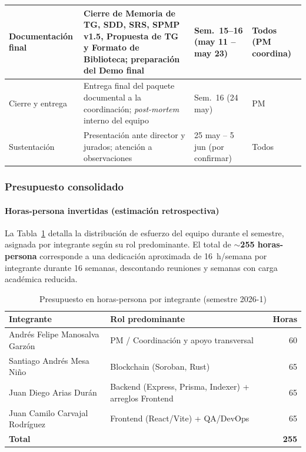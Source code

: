 \documentclass[12pt,oneside]{report}
\begin{document}
\begin{longtable}{@{}p{3.0cm} p{5.2cm} p{2.8cm} p{3.2cm}@{}}
        \midrule
        Documentación final & Cierre de Memoria de TG, SDD, SRS, SPMP v1.5, Propuesta de TG y Formato de Biblioteca; preparación del Demo final & Sem.~15--16 (may 11 -- may 23) & Todos (PM coordina)\\
        \midrule
        Cierre y entrega & Entrega final del paquete documental a la coordinación; \textit{post-mortem} interno del equipo & Sem.~16 (24 may) & PM\\
        \midrule
        Sustentación & Presentación ante director y jurados; atención a observaciones & 25 may -- 5 jun (por confirmar) & Todos\\
      \end{longtable}

      \subsubsection{Presupuesto consolidado}

      \paragraph{Horas-persona invertidas (estimación retrospectiva)}
      La Tabla~\ref{tab:horas-persona} detalla la distribución de esfuerzo del equipo durante el semestre, asignada por integrante según su rol predominante. El total de \textbf{$\sim$255 horas-persona} corresponde a una dedicación aproximada de 16~h/semana por integrante durante 16 semanas, descontando reuniones y semanas con carga académica reducida.

      \begin{table}[H]
        \centering
        \begin{tabular}{@{}p{6.5cm} p{4.8cm} r@{}}
          \toprule
          \textbf{Integrante} & \textbf{Rol predominante} & \textbf{Horas}\\
          \midrule
          Andrés Felipe Manosalva Garzón & PM / Coordinación y apoyo transversal & 60\\
          Santiago Andrés Mesa Niño & Blockchain (Soroban, Rust) & 65\\
          Juan Diego Arias Durán & Backend (Express, Prisma, Indexer) + arreglos Frontend & 65\\
          Juan Camilo Carvajal Rodríguez & Frontend (React/Vite) + QA/DevOps & 65\\
          \midrule
          \textbf{Total} & & \textbf{255}\\
          \bottomrule
        \end{tabular}
        \caption{Presupuesto en horas-persona por integrante (semestre 2026-1)}
        \label{tab:horas-persona}
      \end{table}
\end{document}
